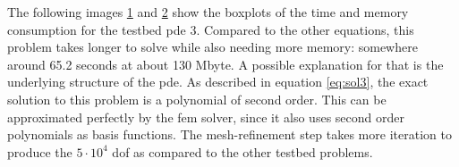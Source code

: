 \documentclass[./\jobname.tex]{subfiles}
\begin{document}
The following images \ref{fig:_fem_time_boxplot_pde3} and \ref{fig:_fem_mem_boxplot_pde3} show the boxplots of the time and memory consumption for the testbed \gls{pde} 3. Compared to the other equations, this problem takes longer to solve while also needing more memory: somewhere around 65.2 seconds at about 130 Mbyte. A possible explanation for that is the underlying structure of the \gls{pde}. As described in equation \ref{eq:sol3}, the exact solution to this problem is a polynomial of second order. This can be approximated perfectly by the \gls{fem} solver, since it also uses second order polynomials as basis functions. The mesh-refinement step takes more iteration to produce the $5 \cdot 10^4$ \gls{dof} as compared to the other testbed problems. 

\begin{figure}[H]
	\centering
	\noindent{}
	\label{fig:_fem_time_boxplot_pde3}
\end{figure}

\begin{figure}[H]
	\centering
	\noindent{}
	\label{fig:_fem_mem_boxplot_pde3}
\end{figure}
\end{document}
